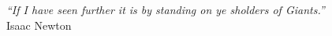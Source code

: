 \cleardoublepage
\thispagestyle{plain}

\vspace*{8cm}

\begin{flushright}
   \textsl{``If I have seen further it is by standing on ye sholders of Giants.''} \\
\vspace*{1.5cm}
           Isaac Newton
\end{flushright}
